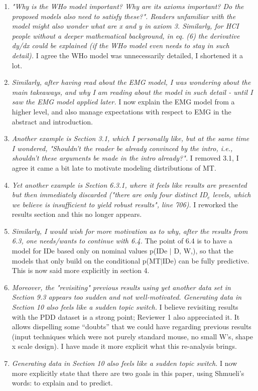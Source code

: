 \documentclass{article}
\begin{document}
\begin{enumerate}
    \item \textit{"Why is the WHo model important? Why are its axioms important? Do the proposed models also need to satisfy these?". Readers unfamiliar with the model might also wonder what are x and y in axiom 3. Similarly, for HCI people without a deeper mathematical background, in eq. (6) the derivative dy/dx could be explained (if the WHo model even needs to stay in such detail).} I agree the WHo model was unnecessarily detailed, I shortened it a lot.
    \item \textit{Similarly, after having read about the EMG model, I was wondering about the main takeaways, and why I am reading about the model in such detail - until I saw the EMG model applied later.} I now explain the EMG model from a higher level, and also manage expectations with respect to EMG in the abstract and introduction.
    \item \textit{Another example is Section 3.1, which I personally like, but at the same time I wondered, "Shouldn't the reader be already convinced by the intro, i.e., shouldn't these arguments be made in the intro already?".} I removed 3.1, I agree it came a bit late to motivate modeling distributions of MT. 
    \item \textit{Yet another example is Section 6.3.1, where it feels like results are presented but then immediately discarded ("there are only four distinct ID$_e$ levels, which we believe is insufficient to yield robust results", line 706).} I reworked the results section and this no longer appears.
    \item \textit{Similarly, I would wish for more motivation as to why, after the results from 6.3, one needs/wants to continue with 6.4.} The point of 6.4 is to have a model for IDe based only on nominal values p(IDe $\mid$ D, W,), so that the models that only build on the conditional p(MT$\mid$IDe) can be fully predictive. This is now said more explicitly in section 4.
    \item \textit{Moreover, the "revisiting" previous results using yet another data set in Section 9.3 appears too sudden and not well-motivated. Generating data in Section 10 also feels like a sudden topic switch.} I believe revisiting results with the PDD dataset is a strong point; Reviewer 1 also appreciated it. It allows dispelling some ``doubts'' that we could have regarding previous results (input techniques which were not purely standard mouse, no small W's, shape x scale design). I have made it more explicit what this re-analysis brings.
    \item \textit{ Generating data in Section 10 also feels like a sudden topic switch. } I now more explicitly state that there are two goals in this paper, using Shmueli's words:  to explain and to predict.

\end{enumerate}
\end{document}
